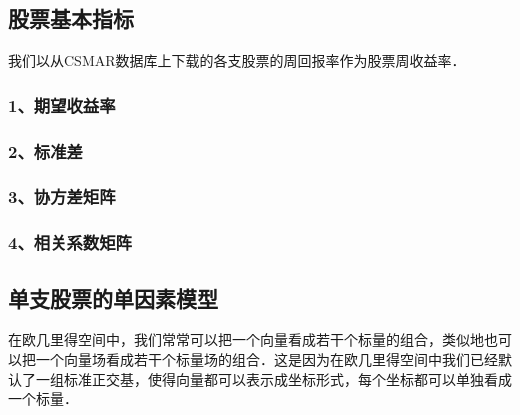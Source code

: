 
\subsection{股票基本指标}
我们以从CSMAR数据库上下载的各支股票的周回报率作为股票周收益率．
\subsubsection{1、期望收益率}

\subsubsection{2、标准差}
\subsubsection{3、协方差矩阵}
\subsubsection{4、相关系数矩阵}

\subsection{单支股票的单因素模型}
在欧几里得空间中，我们常常可以把一个向量看成若干个标量的组合，类似地也可以把一个向量场看成若干个标量场的组合．这是因为在欧几里得空间中我们已经默认了一组标准正交基，使得向量都可以表示成坐标形式，每个坐标都可以单独看成一个标量．